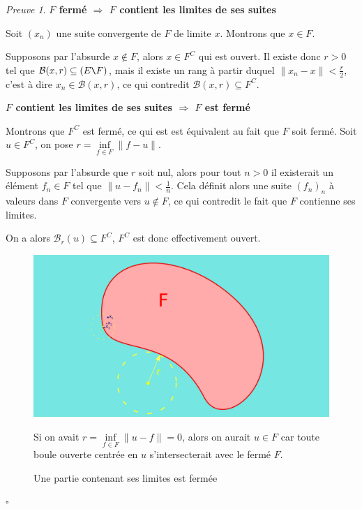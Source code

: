 \documentclass[]{article}
\theoremstyle{remark}
\newtheorem{myproof}{Preuve}
\theoremstyle{definition}
\newcommand{\cqfd}{
	\hfill$\square$
}
\newenvironment{proofpart}[1]{
	\noindent
	{\textbf{\boldmath #1}}
}{
	\checkmark
}
\begin{document}
\begin{myproof}
	\begin{proofpart}{$F$ fermé $\Longrightarrow$ $F$ contient les limites de ses suites}

		Soit $(x_n)$ une suite convergente de $F$ de limite $x$. Montrons que $x \in F$.
		
		Supposons par l'absurde $x \not \in F$, alors $x \in F^C$ qui est ouvert. Il existe donc $r > 0$ tel que $\mathcal{B}(x, r) \subseteq (E \verb|\|F)$, mais il existe un rang à partir duquel $\|x_n-x\| < \frac{r}{2}$, c'est à dire $x_n \in \mathcal{B}(x, r)$, ce qui contredit $\mathcal{B}(x, r) \subseteq F^C$.
	\end{proofpart}
	
	
	\begin{proofpart}{$F$ contient les limites de ses suites $\Longrightarrow$ $F$ est fermé}
		Montrons que $F^C$ est fermé, ce qui est est équivalent au fait que $F$ soit fermé.
		Soit $u \in F^C$, on pose $r=\inf\limits_{f \in F} \|f-u\|$.
		
		Supposons par l'absurde que $r$ soit nul, alors pour tout $n>0$ il existerait un élément $f_n \in F$ tel que $\|u-f_n\| < \frac{1}{n}$. Cela définit alors une suite $(f_n)_n$ à valeurs dans $F$ convergente vers $u \notin F$, ce qui contredit le fait que $F$ contienne ses limites.
		
		On a alors $\mathcal{B}_r(u) \subseteq F^C$, $F^C$ est donc effectivement ouvert.
	\end{proofpart}
	\begin{figure}[h!]
		\centering
		\includegraphics[width=450pt]{Contient_ses_limites_implique_ferme}
		\caption{Une partie contenant ses limites est fermée}
		
		Si on avait $r=\inf\limits_{f \in F} \|u-f\|=0$, alors on aurait $u \in F$ car toute boule ouverte centrée en $u$ s'intersecterait avec le fermé $F$. 
	\end{figure}	
	\cqfd
\end{myproof}
\end{document}
